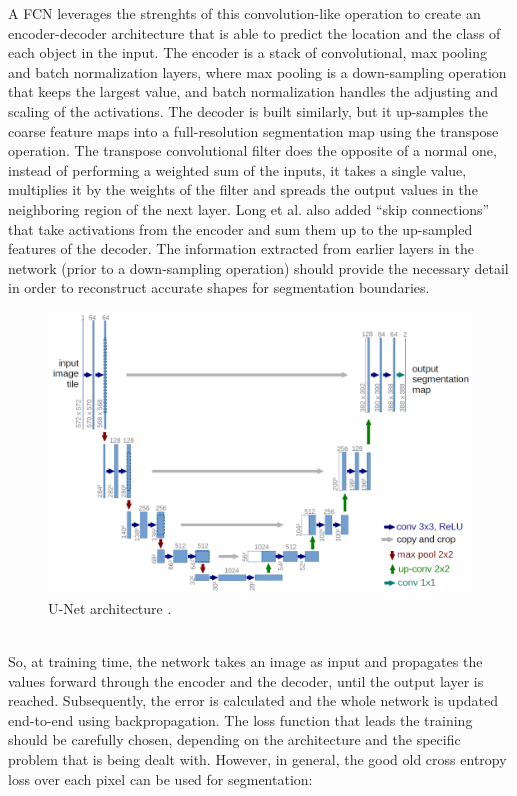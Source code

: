 A FCN leverages the strenghts of this convolution-like operation to create an encoder-decoder architecture that is able to predict the location and the class of each object in the input. The encoder is a stack of convolutional, max pooling and batch normalization layers, where max pooling is a down-sampling operation that keeps the largest value, and batch normalization \cite{ioffe2015batch} handles the adjusting and scaling of the activations. The decoder is built similarly, but it up-samples the coarse feature maps into a full-resolution segmentation map using the transpose operation. The transpose convolutional filter does the opposite of a normal one, instead of performing a weighted sum of the inputs, it takes a single value, multiplies it by the weights of the filter and spreads the output values in the neighboring region of the next layer. Long et al. also added ``skip connections'' that take activations from the encoder and sum them up to the up-sampled features of the decoder. The information extracted from earlier layers in the network (prior to a down-sampling operation) should provide the necessary detail in order to reconstruct accurate shapes for segmentation boundaries.\\
\begin{figure}[t]
    \centering
    \includegraphics[width=\textwidth]{./pictures/u-net}
    \caption{U-Net architecture \cite{ronneberger2015u}.}
    \label{fig:unet}
\end{figure}\\
So, at training time, the network takes an image as input and propagates the values forward through the encoder and the decoder, until the output layer is reached. Subsequently, the error is calculated and the whole network is updated end-to-end using backpropagation. The loss function that leads the training should be carefully chosen, depending on the architecture and the specific problem that is being dealt with. However, in general, the good old cross entropy loss over each pixel can be used for segmentation:
